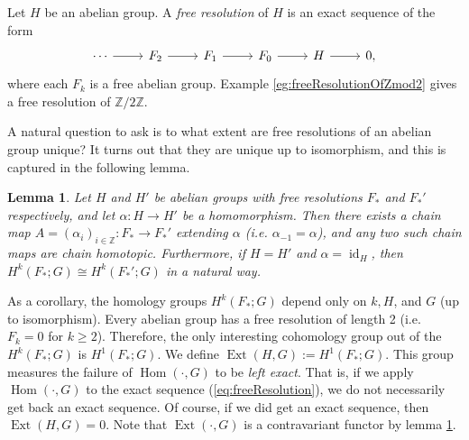 \documentclass{book}
\newcommand{\bbZ}{\mathbb{Z}}
\newcommand{\bbZmod}[1]{\bbZ/{#1}\bbZ}
\DeclareMathOperator{\id}{id}
\DeclareMathOperator{\Hom}{Hom}
\DeclareMathOperator{\Ext}{Ext}
\newtheorem{lemma}[theorem]{Lemma}
\theoremstyle{definition}
\theoremstyle{remark}
\numberwithin{equation}{section}
\begin{document}
Let $H$ be an abelian group. A \textit{free resolution} of $H$ is an exact sequence of the form 
\begin{equation} \label{eq:freeResolution}
    \begin{tikzcd}
        \cdots \arrow[r] & F_2 \arrow[r] & F_1 \arrow[r] & F_0 \arrow[r] & H \arrow[r] & 0,
    \end{tikzcd}
\end{equation}
where each $F_k$ is a free abelian group. Example \ref{eg:freeResolutionOfZmod2} gives a free resolution of $\bbZmod{2}$.

A natural question to ask is to what extent are free resolutions of an abelian group unique? It turns out that they are unique up to isomorphism, and this is captured in the following lemma.
\begin{lemma} \label{lem:homomorphismInducesChainMapOfFreeResolutions}
    Let $H$ and $H'$ be abelian groups with free resolutions $F_*$ and $F_*'$ respectively, and let $\alpha \colon H \to H'$ be a homomorphism. Then there exists a chain map $A = (\alpha_i)_{i \in \bbZ} \colon F_* \to F_*'$ extending $\alpha$ (i.e. $\alpha_{-1} = \alpha$), and any two such chain maps are chain homotopic. Furthermore, if $H = H'$ and $\alpha = \id_H$, then $H^k(F_*;G) \cong H^k(F_*';G)$ in a natural way.
\end{lemma}
As a corollary, the homology groups $H^k(F_*;G)$ depend only on $k,H$, and $G$ (up to isomorphism). Every abelian group has a free resolution of length 2 (i.e. $F_k = 0$ for $k \geq 2$). Therefore, the only interesting cohomology group out of the $H^k(F_*;G)$ is $H^1(F_*;G)$. We define $\Ext(H,G) := H^1(F_*;G)$. This group measures the failure of $\Hom(\cdot,G)$ to be \textit{left exact}. That is, if we apply $\Hom(\cdot,G)$ to the exact sequence (\ref{eq:freeResolution}), we do not necessarily get back an exact sequence. Of course, if we did get an exact sequence, then $\Ext(H,G) = 0$. Note that $\Ext(\cdot,G)$ is a contravariant functor by lemma \ref{lem:homomorphismInducesChainMapOfFreeResolutions}.
\end{document}
